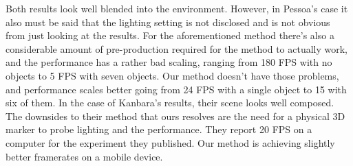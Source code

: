Both results look well blended into the environment. However, in Pessoa's case it also must be said that the lighting setting is not disclosed and is not obvious from just looking at the results. For the aforementioned method there's also a considerable amount of pre-production required for the method to actually work, and the performance has a rather bad scaling, ranging from 180 FPS with no objects to 5 FPS with seven objects. Our method doesn't have those problems, and performance scales better going from 24 FPS with a single object to 15 with six of them.\newline
In the case of Kanbara's results, their scene looks well composed. The downsides to their method that ours resolves are the need for a physical 3D marker to probe lighting and the performance. They report 20 FPS on a computer for the experiment they published. Our method is achieving slightly better framerates on a mobile device.\newline
